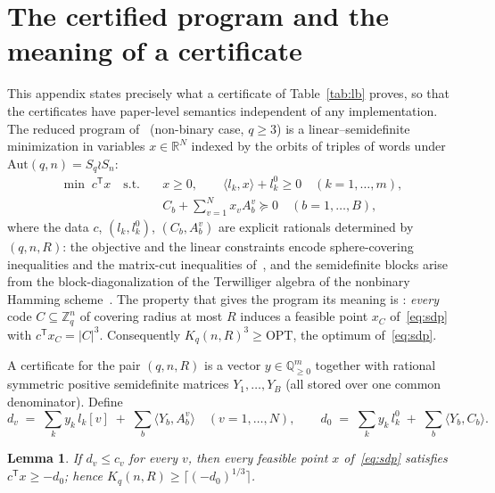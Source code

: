 \documentclass[11pt]{amsart}
\newtheorem{lemma}[theorem]{Lemma}
\newcommand{\Zq}{\mathbb{Z}_q}
\begin{document}
\section{The certified program and the meaning of a
certificate}\label{app:sdp}

This appendix states precisely what a certificate of Table~\ref{tab:lb}
proves, so that the certificates have paper-level semantics independent of
any implementation. The reduced program of~\cite[Theorem~4.18]{GijswijtPolak}
(non-binary case, $q\ge 3$) is a linear--semidefinite minimization in
variables $x\in\mathbb{R}^N$ indexed by the orbits of triples of words
under $\mathrm{Aut}(q,n)=S_q\wr S_n$:
\begin{equation}\label{eq:sdp}
\begin{aligned}
\min\; c^{\mathsf T}x
\quad\text{s.t.}\quad
& x\ge 0,\qquad
\langle l_k,x\rangle + l_k^0 \ge 0 \quad (k=1,\dots,m),\\
& C_b + \textstyle\sum_{v=1}^{N} x_v A_b^v \succeq 0 \quad (b=1,\dots,B),
\end{aligned}
\end{equation}
where the data $c$, $(l_k,l_k^0)$, $(C_b,A_b^v)$ are explicit rationals
determined by $(q,n,R)$: the objective and the linear constraints encode
sphere-covering inequalities and the matrix-cut inequalities
of~\cite[Proposition~4.17]{GijswijtPolak}, and the semidefinite blocks
arise from the block-diagonalization of the Terwilliger algebra of the
nonbinary Hamming scheme~\cite[\S 3]{GijswijtPolak}. The property that
gives the program its meaning is
\cite[Theorem~4.18]{GijswijtPolak}: \emph{every} code
$C\subseteq\Zq^n$ of covering radius at most $R$ induces a feasible point
$x_C$ of~\eqref{eq:sdp} with $c^{\mathsf T}x_C=|C|^3$. Consequently
$K_q(n,R)^3\ge\mathrm{OPT}$, the optimum of~\eqref{eq:sdp}.

A certificate for the pair $(q,n,R)$ is a vector $y\in\mathbb{Q}^m_{\ge 0}$
together with rational symmetric positive semidefinite matrices
$Y_1,\dots,Y_B$ (all stored over one common denominator). Define
\[
d_v \;=\; \sum_k y_k\, l_k[v] \;+\; \sum_b \langle Y_b, A_b^v\rangle
\quad (v=1,\dots,N),
\qquad
d_0 \;=\; \sum_k y_k\, l_k^0 \;+\; \sum_b \langle Y_b, C_b\rangle .
\]

\begin{lemma}\label{lem:cert}
If $d_v\le c_v$ for every $v$, then every feasible point $x$
of~\eqref{eq:sdp} satisfies $c^{\mathsf T}x\ge -d_0$; hence
$K_q(n,R)\ge\bigl\lceil(-d_0)^{1/3}\bigr\rceil$.
\end{lemma}
\end{document}
